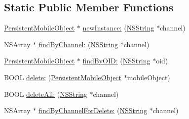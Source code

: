 \subsection*{\-Static \-Public \-Member \-Functions}
\begin{DoxyCompactItemize}
\item 
\hyperlink{interface_persistent_mobile_object}{\-Persistent\-Mobile\-Object} $\ast$ \hyperlink{interface_persistent_mobile_object_afadae5d933027b94bd6a38aa96e4c412}{new\-Instance\-:} (\hyperlink{class_n_s_string}{\-N\-S\-String} $\ast$channel)
\item 
\-N\-S\-Array $\ast$ \hyperlink{interface_persistent_mobile_object_a23e6a6e92e496fb23b7fdd5fd4c68f62}{find\-By\-Channel\-:} (\hyperlink{class_n_s_string}{\-N\-S\-String} $\ast$channel)
\item 
\hyperlink{interface_persistent_mobile_object}{\-Persistent\-Mobile\-Object} $\ast$ \hyperlink{interface_persistent_mobile_object_abaa5de2bf0ecd420000d4579621ee671}{find\-By\-O\-I\-D\-:} (\hyperlink{class_n_s_string}{\-N\-S\-String} $\ast$oid)
\item 
\-B\-O\-O\-L \hyperlink{interface_persistent_mobile_object_a2d1750b3c5f21f200106b653f203fc65}{delete\-:} (\hyperlink{interface_persistent_mobile_object}{\-Persistent\-Mobile\-Object} $\ast$mobile\-Object)
\item 
\-B\-O\-O\-L \hyperlink{interface_persistent_mobile_object_a014364a8615fd8e40062c6a57fa147a7}{delete\-All\-:} (\hyperlink{class_n_s_string}{\-N\-S\-String} $\ast$channel)
\item 
\-N\-S\-Array $\ast$ \hyperlink{interface_persistent_mobile_object_ac9ee4a5d2f50cad16ea9a6fe7579e66d}{find\-By\-Channel\-For\-Delete\-:} (\hyperlink{class_n_s_string}{\-N\-S\-String} $\ast$channel)
\end{DoxyCompactItemize}
